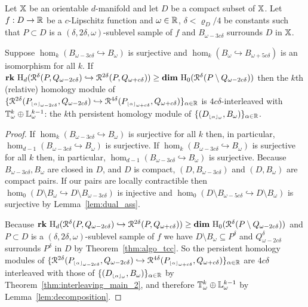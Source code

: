 \begin{theorem}\label{thm:main}
  Let $\mathbb{X}$ be an orientable $d$-manifold and let $D$ be a compact subset of $\mathbb{X}$.
  Let $f : D\to\mathbb{R}$ be a $c$-Lipschitz function and $\omega\in\mathbb{R}$, $\delta < \varrho_D/4$ be constants such that $P\subset D$ is a $(\delta, 2\delta,\omega)$-sublevel sample of $f$ and $B_{\omega-3c\delta}$ surrounds $D$ in $\mathbb{X}$.

  Suppose $\hom_k(B_{\omega-3c\delta}\hookrightarrow B_\omega)$ is surjective and $\hom_k(B_\omega\hookrightarrow B_{\omega+5c\delta})$ is an isomorphism for all $k$.
  If $\mathbf{rk}~\mathrm{H}_d(\mathcal{R}^\delta(P, Q_{\omega - 2c\delta})\hookrightarrow \mathcal{R}^{2\delta}(P, Q_{\omega+c\delta})) \geq \mathbf{dim}~\mathrm{H}_0(\mathcal{R}^\delta(P\setminus Q_{\omega-2c\delta}))$ then the $k$th (relative) homology module of $\{\mathcal{R}^{2\delta}(P_{\scriptscriptstyle \lfloor\alpha\rfloor_{\omega-2c\delta}}, Q_{\omega-2c\delta})\hookrightarrow \mathcal{R}^{4\delta}(P_{\scriptscriptstyle \lfloor\alpha\rfloor_{\omega+c\delta}}, Q_{\omega+c\delta})\}_{\alpha\in\mathbb{R}}$ is $4c\delta$-interleaved with $\mathbb{T}_{\omega}^k \oplus \mathbb{L}_\omega^{k-1}$: the $k$th persistent homology module of $\{(D_{\scriptscriptstyle \lfloor\alpha\rfloor_{\omega}}, B_\omega)\}_{\alpha\in\mathbb{R}}$.
\end{theorem}
\begin{proof}
  If $\hom_k(B_{\omega-3c\delta}\hookrightarrow B_\omega)$ is surjective for all $k$ then, in particular, $\hom_{d-1}(B_{\omega-3c\delta}\hookrightarrow B_\omega)$ is surjective.
  If $\hom_k(B_{\omega-3c\delta}\hookrightarrow B_\omega)$ is surjective for all $k$ then, in particular, $\hom_{d-1}(B_{\omega-3c\delta}\hookrightarrow B_\omega)$ is surjective.
  Because $B_{\omega-3c\delta}, B_\omega$ are closed in $D$, and $D$ is compact, $(D, B_{\omega-3c\delta})$ and $(D,B_\omega)$ are compact pairs.
  If our pairs are locally contractible then $\hom_0(D\setminus B_\omega\hookrightarrow D\setminus B_{\omega-3c\delta})$ is injective and $\hom_0(D\setminus B_{\omega-5c\delta}\hookrightarrow D\setminus B_\omega)$ is surjective by Lemma~\ref{lem:dual_ass}.

  Because $\mathbf{rk}~\mathrm{H}_d(\mathcal{R}^\delta(P, Q_{\omega - 2c\delta})\hookrightarrow \mathcal{R}^{2\delta}(P, Q_{\omega+c\delta})) \geq \mathbf{dim}~\mathrm{H}_0(\mathcal{R}^\delta(P\setminus Q_{\omega-2c\delta}))$ and $P\subset D$ is a $(\delta, 2\delta,\omega)$-sublevel sample of $f$ we have $D\setminus B_\omega\subseteq P^\delta$ and $Q_{\omega-2c\delta}^\delta$ surrounds $P^\delta$ in $D$ by Theorem~\ref{thm:algo_tcc}.
  So the persistent homology modules of $\{\mathcal{R}^{2\delta}(P_{\scriptscriptstyle \lfloor\alpha\rfloor_{\omega-2c\delta}}, Q_{\omega-2c\delta})\hookrightarrow \mathcal{R}^{4\delta}(P_{\scriptscriptstyle \lfloor\alpha\rfloor_{\omega+c\delta}}, Q_{\omega+c\delta})\}_{\alpha\in\mathbb{R}}$ are $4c\delta$ interleaved with those of $\{(D_{\scriptscriptstyle \lfloor\alpha\rfloor_{\omega}}, B_\omega)\}_{\alpha\in\mathbb{R}}$ by Theorem~\ref{thm:interleaving_main_2}, and therefore $\mathbb{T}_{\omega}^k \oplus \mathbb{L}_\omega^{k-1}$ by Lemma~\ref{lem:decomposition}.
\end{proof}
